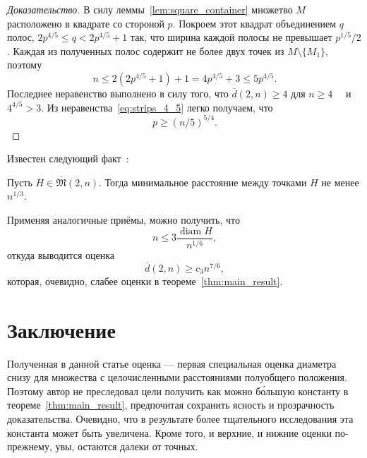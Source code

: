 \documentclass[11pt,twoside,draft
]{article}
\begin{document}
\begin{proof}[Доказательство]
	В силу леммы~\ref{lem:square_container} множетво $M$ расположено в квадрате со стороной $p$.
	Покроем этот квадрат объединением $q$ полос, $2p^{4/5} \leq q < 2p^{4/5} + 1$ так,
	что ширина каждой полосы не превышает $p^{1/5} / 2$.
	Каждая из полученных полос содержит не более двух точек из  $M\setminus\{M_1\}$,
	поэтому
	\begin{equation}
		\label{eq:strips_4_5}
		n \leq 2(2p^{4/5} + 1) + 1
		= 4p^{4/5}+3
		\leq 5 p^{4/5}
		.
	\end{equation}
	Последнее неравенство выполнено в силу того, что $\overline{d}(2,n) \geq 4$ для $n\geq 4$~~\cite{kurz2008minimum}
	и $4^{4/5}>3$.
	Из неравенства~\eqref{eq:strips_4_5} легко получаем, что
	\begin{equation}
		\label{eq:strips_5_4}
		p \geq (n/5) ^ {5/4}
		.
	\end{equation}
\end{proof}



\begin{remark}
	Известен следующий факт~\cite[следствие 1]{solymosi2003note}:
\end{remark}

\begin{lemm}
	Пусть $H \in \overline {\mathfrak{M}}(2,n)$.
	Тогда минимальное расстояние между точками $H$ не менее $n^{1/3}$.
\end{lemm}
Применяя аналогичные приёмы, можно получить, что
\begin{equation}
	n \leq 3 \frac{\operatorname{diam} H }{n^{1/6}}
	,
\end{equation}
откуда выводится оценка
\begin{equation}
	\overline{d}(2,n) \geq c_3 n^{7/6}
	,
\end{equation}
которая, очевидно, слабее оценки в теореме~\ref{thm:main_result}.


\section{Заключение}
Полученная в данной статье оценка ---
первая специальная оценка диаметра снизу для множества с целочисленными расстояниями полуобщего положения.
Поэтому автор не преследовал цели получить как можно б\'{о}льшую константу в теореме~\ref{thm:main_result},
предпочитая сохранить ясность и прозрачность доказательства.
Очевидно, что в результате более тщательного исследования эта константа может быть увеличена.
Кроме того, и верхние, и нижние оценки по-прежнему, увы, остаются далеки от точных.
\end{document}
